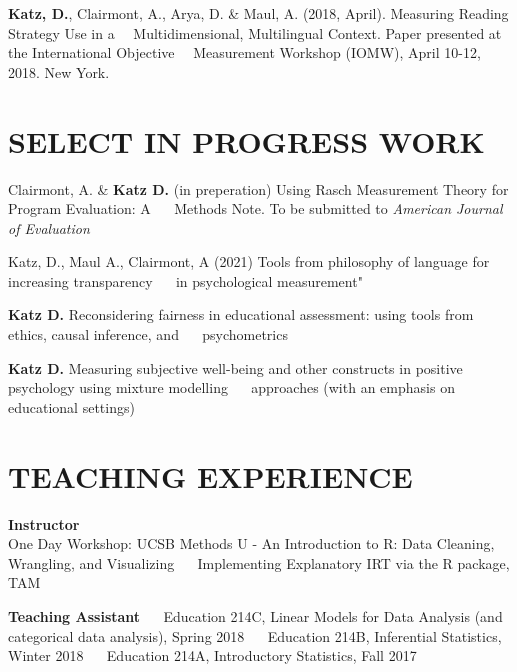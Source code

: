 \documentclass[11pt, oneside]{memoir}
\begin{document}
\textbf{Katz, D.}, Clairmont, A., Arya, D. \& Maul, A. (2018, April).
Measuring Reading Strategy Use in a ~~Multidimensional, Multilingual
Context. Paper presented at the International Objective ~~Measurement
Workshop (IOMW), April 10-12, 2018. New York.

\vspace{7mm}

\hypertarget{select-in-progress-work}{%
\section{SELECT IN PROGRESS WORK}\label{select-in-progress-work}}

Clairmont, A. \& \textbf{Katz D.} (in preperation) Using Rasch
Measurement Theory for Program Evaluation: A ~~ Methods Note. To be
submitted to \emph{American Journal of Evaluation}

Katz, D., Maul A., Clairmont, A (2021) Tools from philosophy of language
for increasing transparency ~~ in psychological measurement"

\textbf{Katz D.} Reconsidering fairness in educational assessment: using
tools from ethics, causal inference, and ~~ psychometrics

\textbf{Katz D.} Measuring subjective well-being and other constructs in
positive psychology using mixture modelling ~~ approaches (with an
emphasis on educational settings)

\vspace{7mm}

\hypertarget{teaching-experience}{%
\section{TEACHING EXPERIENCE}\label{teaching-experience}}

\textbf{Instructor}\\
\hspace*{0.333em}\hspace*{0.333em} One Day Workshop: UCSB Methods U - An
Introduction to R: Data Cleaning, Wrangling, and Visualizing ~~
Implementing Explanatory IRT via the R package, TAM

\textbf{Teaching Assistant} ~~ Education 214C, Linear Models for Data
Analysis (and categorical data analysis), Spring 2018 ~~ Education 214B,
Inferential Statistics, Winter 2018 ~~ Education 214A, Introductory
Statistics, Fall 2017\\
\vspace{7mm}
\end{document}
